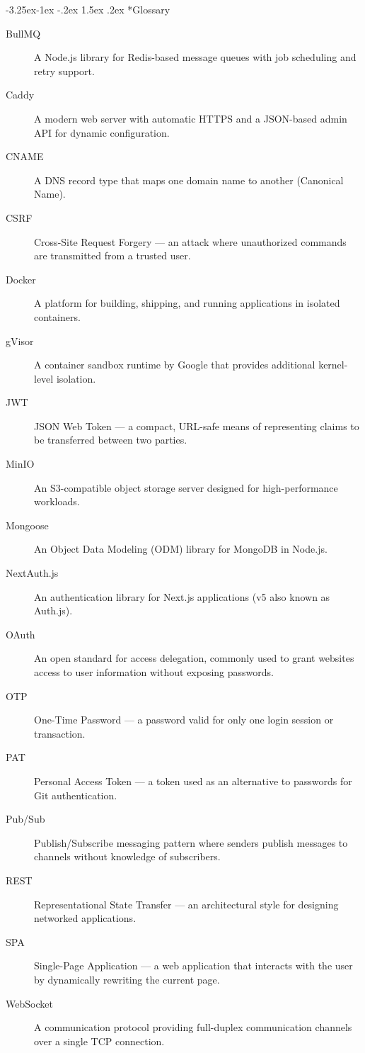 \documentclass[12pt,a4paper]{article}
\makeatletter
\renewcommand\subsection{\@startsection{subsection}{2}{\z@}%
  {-3.25ex\@plus -1ex \@minus -.2ex}%
  {1.5ex \@plus .2ex}%
  {\needspace{2\baselineskip}\normalfont\large\bfseries}}
\makeatother
\begin{document}
\subsection*{Glossary}
\begin{description}
    \item[BullMQ] A Node.js library for Redis-based message queues with job scheduling and retry support.
    \item[Caddy] A modern web server with automatic HTTPS and a JSON-based admin API for dynamic configuration.
    \item[CNAME] A DNS record type that maps one domain name to another (Canonical Name).
    \item[CSRF] Cross-Site Request Forgery --- an attack where unauthorized commands are transmitted from a trusted user.
    \item[Docker] A platform for building, shipping, and running applications in isolated containers.
    \item[gVisor] A container sandbox runtime by Google that provides additional kernel-level isolation.
    \item[JWT] JSON Web Token --- a compact, URL-safe means of representing claims to be transferred between two parties.
    \item[MinIO] An S3-compatible object storage server designed for high-performance workloads.
    \item[Mongoose] An Object Data Modeling (ODM) library for MongoDB in Node.js.
    \item[NextAuth.js] An authentication library for Next.js applications (v5 also known as Auth.js).
    \item[OAuth] An open standard for access delegation, commonly used to grant websites access to user information without exposing passwords.
    \item[OTP] One-Time Password --- a password valid for only one login session or transaction.
    \item[PAT] Personal Access Token --- a token used as an alternative to passwords for Git authentication.
    \item[Pub/Sub] Publish/Subscribe messaging pattern where senders publish messages to channels without knowledge of subscribers.
    \item[REST] Representational State Transfer --- an architectural style for designing networked applications.
    \item[SPA] Single-Page Application --- a web application that interacts with the user by dynamically rewriting the current page.
    \item[WebSocket] A communication protocol providing full-duplex communication channels over a single TCP connection.
\end{description}
\end{document}
